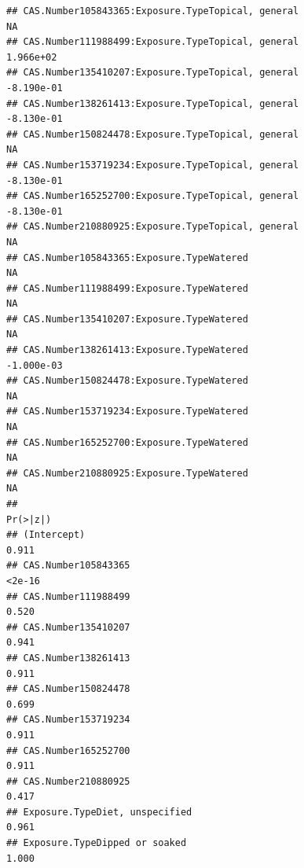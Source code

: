 \documentclass[
  12pt,
]{article}
\begin{document}
\begin{verbatim}
## CAS.Number105843365:Exposure.TypeTopical, general                                       NA
## CAS.Number111988499:Exposure.TypeTopical, general                                1.966e+02
## CAS.Number135410207:Exposure.TypeTopical, general                               -8.190e-01
## CAS.Number138261413:Exposure.TypeTopical, general                               -8.130e-01
## CAS.Number150824478:Exposure.TypeTopical, general                                       NA
## CAS.Number153719234:Exposure.TypeTopical, general                               -8.130e-01
## CAS.Number165252700:Exposure.TypeTopical, general                               -8.130e-01
## CAS.Number210880925:Exposure.TypeTopical, general                                       NA
## CAS.Number105843365:Exposure.TypeWatered                                                NA
## CAS.Number111988499:Exposure.TypeWatered                                                NA
## CAS.Number135410207:Exposure.TypeWatered                                                NA
## CAS.Number138261413:Exposure.TypeWatered                                        -1.000e-03
## CAS.Number150824478:Exposure.TypeWatered                                                NA
## CAS.Number153719234:Exposure.TypeWatered                                                NA
## CAS.Number165252700:Exposure.TypeWatered                                                NA
## CAS.Number210880925:Exposure.TypeWatered                                                NA
##                                                                                 Pr(>|z|)
## (Intercept)                                                                        0.911
## CAS.Number105843365                                                               <2e-16
## CAS.Number111988499                                                                0.520
## CAS.Number135410207                                                                0.941
## CAS.Number138261413                                                                0.911
## CAS.Number150824478                                                                0.699
## CAS.Number153719234                                                                0.911
## CAS.Number165252700                                                                0.911
## CAS.Number210880925                                                                0.417
## Exposure.TypeDiet, unspecified                                                     0.961
## Exposure.TypeDipped or soaked                                                      1.000

\end{verbatim}
\end{document}
